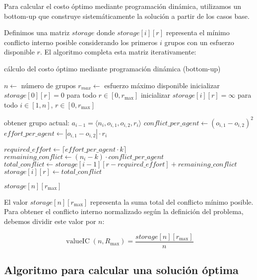 Para calcular el costo óptimo mediante programación dinámica, utilizamos un bottom-up que construye sistemáticamente la solución a partir de los casos base.

Definimos una matriz $storage$ donde $storage[i][r]$ representa el mínimo conflicto interno posible considerando los primeros $i$ grupos con un esfuerzo disponible $r$. El algoritmo completa esta matriz iterativamente:

\begin{algorithm}[H]
	\caption{cálculo del costo óptimo mediante programación dinámica (bottom-up)}
	\begin{algorithmic}[1]
		\State $n \gets$ número de grupos
		\State $r_{max} \gets$ esfuerzo máximo disponible
		\State inicializar $storage[0][r] = 0$ para todo $r \in [0,r_{ \max }]$
		\State inicializar $storage[i][r] = \infty$ para todo $i \in [1,n]$, $r \in [0, r_{ \max }]$

			\State obtener grupo actual: $a_{ i - 1 } = \langle n_i,o_{ i,1 },o_{ i,2 },r_i \rangle$
			\State $conflict\_per\_agent \gets (o_{ i,1 } - o_{ i,2 })^2$
			\State $effort\_per\_agent \gets |o_{ i,1 } - o_{ i,2 }| \cdot r_i$

					\State $required\_effort \gets \lceil effort\_per\_agent \cdot k \rceil$
						\State $remaining\_conflict \gets (n_i - k) \cdot conflict\_per\_agent$
						\State $total\_conflict \gets storage[i - 1][r-required\_effort] + remaining\_conflict$
							\State $storage[i][r] \gets total\_conflict$
						\EndIf
					\EndIf
				\EndFor
			\EndFor
		\EndFor

		\State \Return $storage[n][r_{ \max }]$
	\end{algorithmic}
\end{algorithm}

El valor $storage[n][r_{ \max }]$ representa la suma total del conflicto mínimo posible. Para obtener el conflicto interno normalizado según la definición del problema, debemos dividir este valor por $n$:

\begin{equation}
	\operatorname{ valueIC }(n,R_{ \max }) = \frac{ storage[n][r_{ \max }] }{ n }
\end{equation}

\subsection{Algoritmo para calcular una solución óptima}

